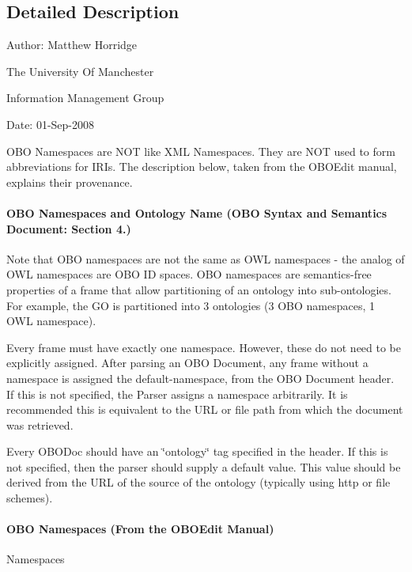 \subsection{Detailed Description}
Author\-: Matthew Horridge\par
 The University Of Manchester\par
 Information Management Group\par
 Date\-: 01-\/\-Sep-\/2008\par
\par
 

O\-B\-O Namespaces are N\-O\-T like X\-M\-L Namespaces. They are N\-O\-T used to form abbreviations for I\-R\-Is. The description below, taken from the O\-B\-O\-Edit manual, explains their provenance. 

\paragraph*{O\-B\-O Namespaces and Ontology Name (O\-B\-O Syntax and Semantics Document\-: Section 4.)}

Note that O\-B\-O namespaces are not the same as O\-W\-L namespaces -\/ the analog of O\-W\-L namespaces are O\-B\-O I\-D spaces. O\-B\-O namespaces are semantics-\/free properties of a frame that allow partitioning of an ontology into sub-\/ontologies. For example, the G\-O is partitioned into 3 ontologies (3 O\-B\-O namespaces, 1 O\-W\-L namespace). 

Every frame must have exactly one namespace. However, these do not need to be explicitly assigned. After parsing an O\-B\-O Document, any frame without a namespace is assigned the default-\/namespace, from the O\-B\-O Document header. If this is not specified, the Parser assigns a namespace arbitrarily. It is recommended this is equivalent to the U\-R\-L or file path from which the document was retrieved. 

Every O\-B\-O\-Doc should have an \char`\"{}ontology\char`\"{} tag specified in the header. If this is not specified, then the parser should supply a default value. This value should be derived from the U\-R\-L of the source of the ontology (typically using http or file schemes). 

\paragraph*{O\-B\-O Namespaces (From the O\-B\-O\-Edit Manual)}

Namespaces 

